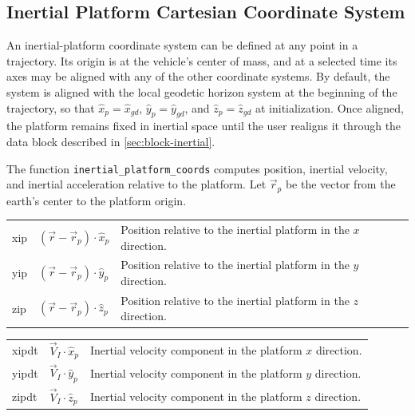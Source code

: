 \subsection{Inertial Platform Cartesian Coordinate System}\label{sec:inertial-platform}

An inertial-platform coordinate system can be defined at any point in a trajectory.
Its origin is at the vehicle's center of mass, and at a selected time its axes may be
aligned with any of the other coordinate systems. By default, the system is aligned
with the local geodetic horizon system at the beginning of the trajectory, so that
$\hat x_p=\hat x_{gd}$, $\hat y_p=\hat y_{gd}$, and
$\hat z_p=\hat z_{gd}$ at initialization. Once aligned, the platform remains fixed
in inertial space until the user realigns it through the
 data block described in \cref{sec:block-inertial}.

The function \texttt{inertial\_platform\_coords} computes position, inertial
velocity, and inertial acceleration relative to the platform. Let $\vec r_p$ be the
vector from the earth's center to the platform origin.


\begin{longtable}{@{}>{\ttfamily}p{}p{}p{}@{}}
  xip & $(\vec r-\vec r_p)\mathbin{\cdot}\hat x_p$ &
    Position relative to the inertial platform in the $x$ direction.\\
  yip & $(\vec r-\vec r_p)\mathbin{\cdot}\hat y_p$ &
    Position relative to the inertial platform in the $y$ direction.\\
  zip & $(\vec r-\vec r_p)\mathbin{\cdot}\hat z_p$ &
    Position relative to the inertial platform in the $z$ direction.\\
\end{longtable}


\begin{longtable}{@{}>{\ttfamily}p{}p{}p{}@{}}
  xipdt & $\vec V_I\mathbin{\cdot}\hat x_p$ &
    Inertial velocity component in the platform $x$ direction.\\
  yipdt & $\vec V_I\mathbin{\cdot}\hat y_p$ &
    Inertial velocity component in the platform $y$ direction.\\
  zipdt & $\vec V_I\mathbin{\cdot}\hat z_p$ &
    Inertial velocity component in the platform $z$ direction.\\
\end{longtable}

